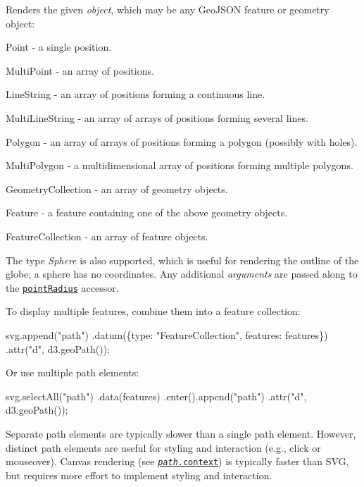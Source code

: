 Renders the given {\itshape object}, which may be any Geo\+J\+S\+ON feature or geometry object\+:


\begin{DoxyItemize}
\item Point -\/ a single position.
\item Multi\+Point -\/ an array of positions.
\item Line\+String -\/ an array of positions forming a continuous line.
\item Multi\+Line\+String -\/ an array of arrays of positions forming several lines.
\item Polygon -\/ an array of arrays of positions forming a polygon (possibly with holes).
\item Multi\+Polygon -\/ a multidimensional array of positions forming multiple polygons.
\item Geometry\+Collection -\/ an array of geometry objects.
\item Feature -\/ a feature containing one of the above geometry objects.
\item Feature\+Collection -\/ an array of feature objects.
\end{DoxyItemize}

The type {\itshape Sphere} is also supported, which is useful for rendering the outline of the globe; a sphere has no coordinates. Any additional {\itshape arguments} are passed along to the \href{#path_pointRadius}{\tt point\+Radius} accessor.

To display multiple features, combine them into a feature collection\+:


\begin{DoxyCode}
svg.append("path")
    .datum(\{type: "FeatureCollection", features: features\})
    .attr("d", d3.geoPath());
\end{DoxyCode}


Or use multiple path elements\+:


\begin{DoxyCode}
svg.selectAll("path")
  .data(features)
  .enter().append("path")
    .attr("d", d3.geoPath());
\end{DoxyCode}


Separate path elements are typically slower than a single path element. However, distinct path elements are useful for styling and interaction (e.\+g., click or mouseover). Canvas rendering (see \href{#path_context}{\tt {\itshape path}.context}) is typically faster than S\+VG, but requires more effort to implement styling and interaction.

